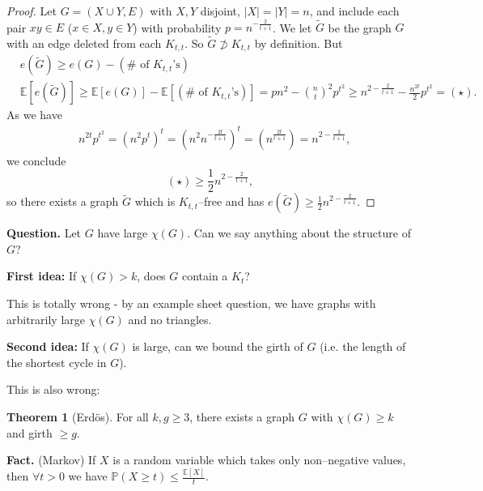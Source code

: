 \documentclass{article}
\theoremstyle{definition}
\newtheorem{theorem}{Theorem}[section]
\begin{document}

\begin{proof}
    Let $G=(X \cup Y, E)$ with $X,Y$ disjoint, $|X|=|Y|=n$, and include each pair $xy \in E$ ($x \in X, y \in Y$) with probability $p=n^{-\frac{2}{t+1}}$. We let $\tilde{G}$ be the graph $G$ with an edge deleted from each $K_{t,t}$. So $\tilde{G} \not\supset K_{t,t}$ by definition. But 
    \begin{align*}
        &e(\tilde{G}) \ge e(G) - (\# \text{ of }K_{t,t}\text{'s}) \\
        &\mathbb{E}[e(\tilde{G})] \ge \mathbb{E}[e(G)] - \mathbb{E}[(\# \text{ of }K_{t,t}\text{'s})] = pn^2 - {{n}\choose{t}}^2 p^{t^2} \ge n^{2- \frac{2}{t+1}} - \frac{n^{2t}}{2}p^{t^2} =(\star).
    \end{align*}
    As we have
    \begin{align*}
        &n^{2t} p^{t^2} = (n^2 p^t)^t = (n^2 n^{-\frac{2t}{t+1}})^t = (n^{\frac{2t}{t+1}}) = n^{2-\frac{2}{t+1}},
    \end{align*}
    we conclude \[
    (\star) \ge \frac{1}{2}n^{2-\frac{2}{t+1}},
    \]
    so there exists a graph $\tilde{G}$ which is $K_{t,t}$--free and has $e(\tilde{G}) \ge \frac{1}{2}n^{2-\frac{2}{t+1}}.$
\end{proof}

\textbf{Question.} Let $G$ have large $\chi(G)$. Can we say anything about the structure of $G$?

\textbf{First idea:} If $\chi(G)>k$, does $G$ contain a $K_t$? 

This is totally wrong - by an example sheet question, we have graphs with arbitrarily large $\chi(G)$ and no triangles.

\textbf{Second idea:} If $\chi(G)$ is large, can we bound the girth of $G$ (i.e. the length of the shortest cycle in $G$).

This is also wrong:
\begin{theorem}[Erdös]\label{6.2}
    For all $k,g\ge 3$, there exists a graph $G$ with $\chi(G)\ge k$ and girth $\ge g$.
\end{theorem}
\textbf{Fact.} (Markov) If $X$ is a random variable which takes only non--negative values, then $\forall t>0$ we have $\mathbb{P}(X\ge t) \le \frac{\mathbb{E}[X]}{t}$.
\vspace{1mm}
\end{document}
